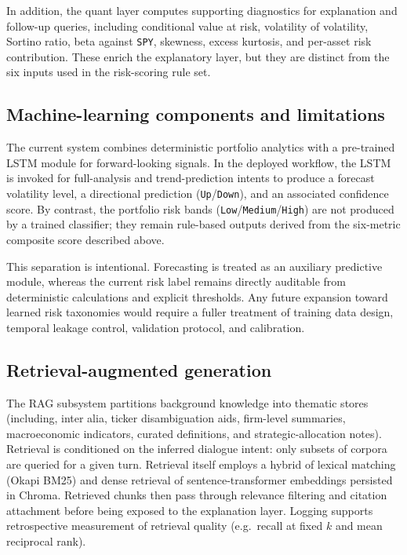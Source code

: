 In addition, the quant layer computes supporting diagnostics for explanation and follow-up queries, including conditional value at risk, volatility of volatility, Sortino ratio, beta against \texttt{SPY}, skewness, excess kurtosis, and per-asset risk contribution. These enrich the explanatory layer, but they are distinct from the six inputs used in the risk-scoring rule set.

\subsection{Machine-learning components and limitations}
The current system combines deterministic portfolio analytics with a pre-trained LSTM module for forward-looking signals. In the deployed workflow, the LSTM is invoked for full-analysis and trend-prediction intents to produce a forecast volatility level, a directional prediction (\texttt{Up}/\texttt{Down}), and an associated confidence score. By contrast, the portfolio risk bands (\texttt{Low}/\texttt{Medium}/\texttt{High}) are not produced by a trained classifier; they remain rule-based outputs derived from the six-metric composite score described above.

This separation is intentional. Forecasting is treated as an auxiliary predictive module, whereas the current risk label remains directly auditable from deterministic calculations and explicit thresholds. Any future expansion toward learned risk taxonomies would require a fuller treatment of training data design, temporal leakage control, validation protocol, and calibration.

\subsection{Retrieval-augmented generation}
The RAG subsystem partitions background knowledge into thematic stores (including, inter alia, ticker disambiguation aids, firm-level summaries, macroeconomic indicators, curated definitions, and strategic-allocation notes). Retrieval is conditioned on the inferred dialogue intent: only subsets of corpora are queried for a given turn. Retrieval itself employs a hybrid of lexical matching (Okapi BM25) and dense retrieval of sentence-transformer embeddings persisted in Chroma. Retrieved chunks then pass through relevance filtering and citation attachment before being exposed to the explanation layer. Logging supports retrospective measurement of retrieval quality (e.g.\ recall at fixed $k$ and mean reciprocal rank).

